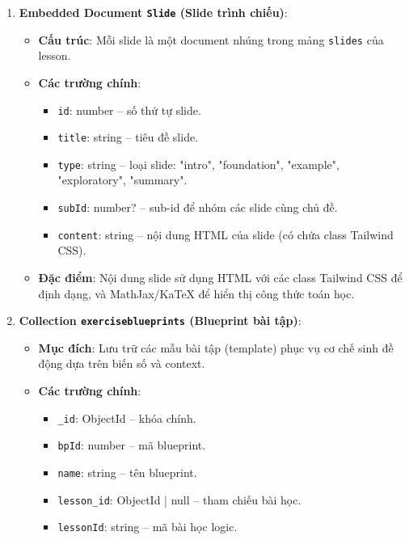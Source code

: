 \begin{enumerate}
    \item \textbf{Embedded Document \texttt{Slide} (Slide trình chiếu)}:
    \begin{itemize}
        \item \textbf{Cấu trúc}: Mỗi slide là một document nhúng trong mảng \texttt{slides} của lesson.
        \item \textbf{Các trường chính}:
        \begin{itemize}
            \item \texttt{id}: number – số thứ tự slide.
            \item \texttt{title}: string – tiêu đề slide.
            \item \texttt{type}: string – loại slide: "intro", "foundation", "example", "exploratory", "summary".
            \item \texttt{subId}: number? – sub-id để nhóm các slide cùng chủ đề.
            \item \texttt{content}: string – nội dung HTML của slide (có chứa class Tailwind CSS).
        \end{itemize}
        \item \textbf{Đặc điểm}: Nội dung slide sử dụng HTML với các class Tailwind CSS để định dạng, và MathJax/KaTeX để hiển thị công thức toán học.
    \end{itemize}

    \item \textbf{Collection \texttt{exerciseblueprints} (Blueprint bài tập)}:
    \begin{itemize}
        \item \textbf{Mục đích}: Lưu trữ các mẫu bài tập (template) phục vụ cơ chế sinh đề động dựa trên biến số và context.
    
        \item \textbf{Các trường chính}:
        \begin{itemize}
            \item \texttt{\_id}: ObjectId – khóa chính.
    
            \item \texttt{bpId}: number – mã blueprint.
    
            \item \texttt{name}: string – tên blueprint.
    
            \item \texttt{lesson\_id}: ObjectId | null – tham chiếu bài học.
    
            \item \texttt{lessonId}: string – mã bài học logic.
    

\end{itemize}
\end{itemize}
\end{enumerate}
